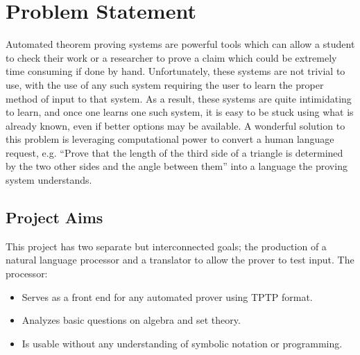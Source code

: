 \section{Problem Statement}                                                                           

Automated theorem proving systems are powerful tools which can allow a student to check their work or a 
researcher to prove a claim which could be extremely time consuming if done by hand. Unfortunately, these
systems are not trivial to use, with the use of any such system requiring the user to learn the proper method of input to that system. As a result, these systems are quite intimidating to learn, and once one learns one such system, it is easy to be stuck using what is already known, even if better options may be available. A wonderful solution to this problem is leveraging computational power to convert a human language request, e.g. ``Prove that the length of the third side of a triangle is determined by the two other sides and the angle between them'' into a language the proving system understands.                     
                                                                                                           
                                                                                                           
  \subsection{Project Aims}                                                                                
This project has two separate but interconnected goals; the production of a natural language processor and a translator to allow the prover to test input. The processor:                                              
  \begin{itemize}                                                                                          
  \item{Serves as a front end for any automated prover using TPTP format.}
  \item{Analyzes basic questions on algebra and set theory.}
  \item{Is usable without any understanding of symbolic notation or programming.}                          
    \end{itemize}                                                                                            
                                                                                                           
